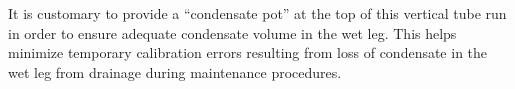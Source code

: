 \vskip 10pt

It is customary to provide a ``condensate pot'' at the top of this vertical tube run in order to ensure adequate condensate volume in the wet leg.  This helps minimize temporary calibration errors resulting from loss of condensate in the wet leg from drainage during maintenance procedures.












